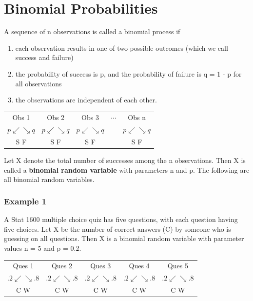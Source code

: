 \documentclass[11pt, chapterprefix=true]{scrbook}\usepackage[]{graphicx}\usepackage[]{color}
\begin{document}
\section{Binomial Probabilities}

A sequence of n observations is called a binomial process if

\begin{enumerate}
\item each observation results in one of two possible outcomes (which we call    success and failure)
\item the probability of success is p, and the probability of failure is q = 1 - p for all observations
\item the observations are independent of each other.
\end{enumerate}

\begin{center}
\begin{tabular}{@{} ccccc @{}} \hline
Obs 1 & Obs 2 & Obs 3 & $\cdots$ & Obs n \\
$p \swarrow  \searrow q$ & $p \swarrow  \searrow q$ & $p \swarrow  \searrow q$ & & $p \swarrow  \searrow q$ \\
S \hspace{3mm}   F & S  \hspace{3mm}  F &  S  \hspace{3mm}  F &  & S \hspace{3mm}   F \\ \hline
\end{tabular}
\end{center}

Let X denote the total number of successes among the n observations.  Then
X is called a \textbf{binomial random variable}  with parameters n and p. The following are all binomial random variables.

\subsubsection{Example 1} A Stat 1600 multiple choice quiz has five questions, with each question having five choices.  Let X be the number of correct answers (C) by someone who is guessing on all questions.  Then X is a binomial random variable with parameter values n = 5 and p = 0.2.

\begin{center}
\begin{tabular}{@{} ccccc @{}} \hline
Ques 1 & Ques 2 & Ques 3 & Ques 4 & Ques 5 \\
$.2 \swarrow  \searrow .8$ & $.2 \swarrow  \searrow .8$ & $.2 \swarrow  \searrow .8$ & $.2 \swarrow  \searrow .8$ & $.2 \swarrow  \searrow .8$ \\
C \hspace{3mm} W & C  \hspace{3mm}  W &  C  \hspace{3mm}  W &   C \hspace{3mm} W & C \hspace{3mm}   W \\ \hline
\end{tabular}
\end{center}
\end{document}
